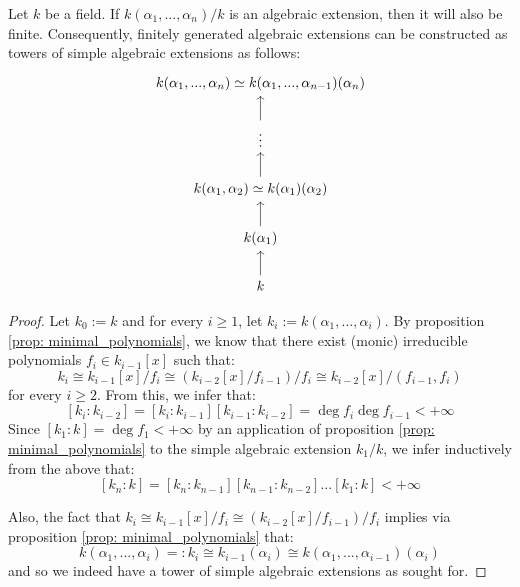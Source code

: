         \begin{lemma} \label{lemma: finitely_generated_algebraic_extensions_are_finite}
            Let $k$ be a field. If $k(\alpha_1, ..., \alpha_n)/k$ is an algebraic extension, then it will also be finite. Consequently, finitely generated algebraic extensions can be constructed as towers of simple algebraic extensions as follows:
                $$
                    \begin{tikzcd}
                	{k(\alpha_1, ..., \alpha_n) \cong k(\alpha_1, ..., \alpha_{n - 1})(\alpha_n)} \\
                	\vdots \\
                	{k(\alpha_1, \alpha_2) \cong k(\alpha_1)(\alpha_2)} \\
                	{k(\alpha_1)} \\
                	k
                	\arrow[from=2-1, to=1-1]
                	\arrow[from=3-1, to=2-1]
                	\arrow[from=4-1, to=3-1]
                	\arrow[from=5-1, to=4-1]
                    \end{tikzcd}
                $$
        \end{lemma}
            \begin{proof}
                Let $k_0 := k$ and for every $i \geq 1$, let $k_i := k(\alpha_1, ..., \alpha_i)$. By proposition \ref{prop: minimal_polynomials}, we know that there exist (monic) irreducible polynomials $f_i \in k_{i - 1}[x]$ such that:
                    $$k_i \cong k_{i - 1}[x]/f_i \cong (k_{i - 2}[x]/f_{i - 1})/f_i \cong k_{i - 2}[x]/(f_{i - 1}, f_i)$$
                for every $i \geq 2$. From this, we infer that:
                    $$[k_i : k_{i - 2}] = [k_i : k_{i - 1}] [k_{i - 1} : k_{i - 2}] = \deg f_i \deg f_{i - 1} < +\infty$$
                Since $[k_1 : k] = \deg f_1 < +\infty$ by an application of proposition \ref{prop: minimal_polynomials} to the simple algebraic extension $k_1/k$, we infer inductively from the above that:
                    $$[k_n : k] = [k_n : k_{n - 1}] [k_{n - 1} : k_{n - 2}] ... [k_1 : k] < +\infty$$

                Also, the fact that $k_i \cong k_{i - 1}[x]/f_i \cong (k_{i - 2}[x]/f_{i - 1})/f_i$ implies via proposition \ref{prop: minimal_polynomials} that:
                    $$k(\alpha_1, ..., \alpha_i) =: k_i \cong k_{i - 1}(\alpha_i) \cong k(\alpha_1, ..., \alpha_{i - 1})(\alpha_i)$$
                and so we indeed have a tower of simple algebraic extensions as sought for.
            \end{proof}
